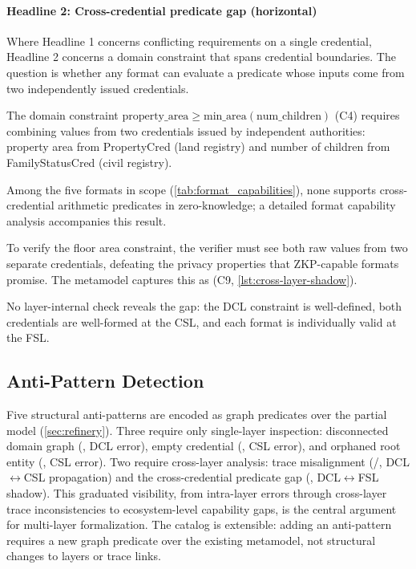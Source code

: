 \paragraph{Headline 2: Cross-credential predicate gap (horizontal)}\label{sec:headline-predicate-gap}

Where Headline 1 concerns conflicting requirements on a single credential, Headline 2 concerns a domain constraint that spans credential boundaries. The question is whether any format can evaluate a predicate whose inputs come from two independently issued credentials.

The domain constraint \(\text{property\_area} \geq \text{min\_area}(\text{num\_children})\) (C4) requires combining values from two credentials issued by independent authorities: property area from PropertyCred (land registry) and number of children from FamilyStatusCred (civil registry).

Among the five formats in scope (\autoref{tab:format_capabilities}), none supports cross-credential arithmetic predicates in zero-knowledge; a detailed format capability analysis accompanies this result.

To verify the floor area constraint, the verifier must see both raw values from two separate credentials, defeating the privacy properties that \acs{ZKP}-capable formats promise. The metamodel captures this as  (C9, \autoref{lst:cross-layer-shadow}).

No layer-internal check reveals the gap: the \ac{DCL} constraint is well-defined, both credentials are well-formed at the \ac{CSL}, and each format is individually valid at the \ac{FSL}.

\subsection{Anti-Pattern Detection}\label{sec:anti-patterns}

Five structural anti-patterns are encoded as graph predicates over the partial model (\autoref{sec:refinery}). Three require only single-layer inspection: disconnected domain graph (, \ac{DCL} error), empty credential (, \ac{CSL} error), and orphaned root entity (, \ac{CSL} error). Two require cross-layer analysis: trace misalignment (/, DCL\(\leftrightarrow\)CSL propagation) and the cross-credential predicate gap (, DCL\(\leftrightarrow\)FSL shadow). This graduated visibility, from intra-layer errors through cross-layer trace inconsistencies to ecosystem-level capability gaps, is the central argument for multi-layer formalization. The catalog is extensible: adding an anti-pattern requires a new graph predicate over the existing metamodel, not structural changes to layers or trace links.


